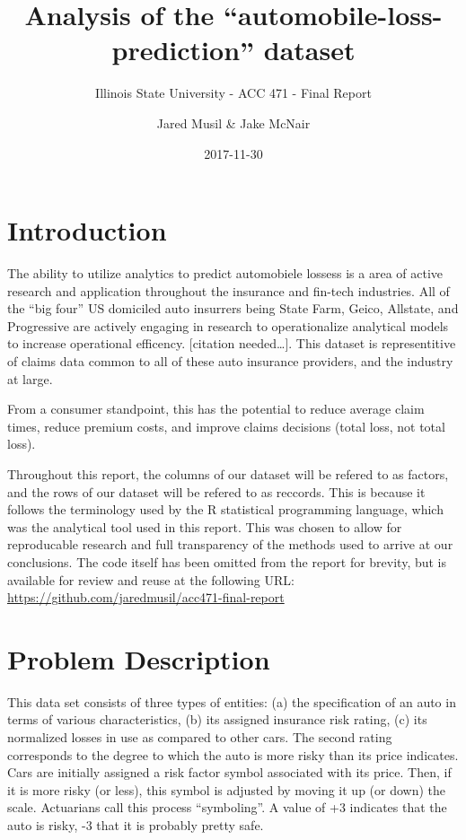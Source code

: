 \documentclass[12pt,openany]{book}
\title{Analysis of the ``automobile-loss-prediction'' dataset}
\subtitle{Illinois State University - ACC 471 - Final Report}
\author{Jared Musil \& Jake McNair}
\date{2017-11-30}
\begin{document}
\maketitle

{
\setcounter{tocdepth}{1}
\tableofcontents
}
\chapter{Introduction}\label{intro}

The ability to utilize analytics to predict automobiele lossess is a
area of active research and application throughout the insurance and
fin-tech industries. All of the ``big four'' US domiciled auto insurrers
being State Farm, Geico, Allstate, and Progressive are actively engaging
in research to operationalize analytical models to increase operational
efficency. {[}citation needed\ldots{}{]}. This dataset is representitive
of claims data common to all of these auto insurance providers, and the
industry at large.

From a consumer standpoint, this has the potential to reduce average
claim times, reduce premium costs, and improve claims decisions (total
loss, not total loss).

Throughout this report, the columns of our dataset will be refered to as
factors, and the rows of our dataset will be refered to as reccords.
This is because it follows the terminology used by the R statistical
programming language, which was the analytical tool used in this report.
This was chosen to allow for reproducable research and full transparency
of the methods used to arrive at our conclusions. The code itself has
been omitted from the report for brevity, but is available for review
and reuse at the following URL:
\url{https://github.com/jaredmusil/acc471-final-report}

\chapter{Problem Description}\label{problem-description}

This data set consists of three types of entities: (a) the specification
of an auto in terms of various characteristics, (b) its assigned
insurance risk rating, (c) its normalized losses in use as compared to
other cars. The second rating corresponds to the degree to which the
auto is more risky than its price indicates. Cars are initially assigned
a risk factor symbol associated with its price. Then, if it is more
risky (or less), this symbol is adjusted by moving it up (or down) the
scale. Actuarians call this process ``symboling''. A value of +3
indicates that the auto is risky, -3 that it is probably pretty safe.
\end{document}
